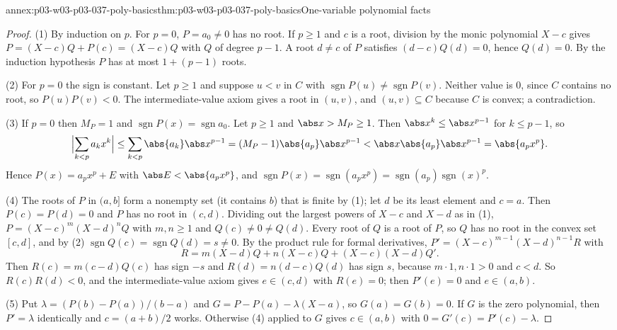 \begin{annexitem}{annex:p03-w03-p03-037-poly-basics}{thm:p03-w03-p03-037-poly-basics}{One-variable polynomial facts}
\begin{proof}
(1) By induction on \(p\).  For \(p=0\), \(P=a_0\neq0\) has no root.  If
\(p\geq1\) and \(c\) is a root, division by the monic polynomial \(X-c\)
gives \(P=(X-c)Q+P(c)=(X-c)Q\) with \(Q\) of degree \(p-1\).  A root
\(d\neq c\) of \(P\) satisfies \((d-c)Q(d)=0\), hence \(Q(d)=0\).  By the
induction hypothesis \(P\) has at most \(1+(p-1)\) roots.

(2) For \(p=0\) the sign is constant.  Let \(p\geq1\) and suppose
\(u<v\) in \(C\) with \(\operatorname{sgn}P(u)\neq\operatorname{sgn}P(v)\).
Neither value is \(0\), since \(C\) contains no root, so
\(P(u)P(v)<0\).  The intermediate-value axiom gives a root in \((u,v)\), and
\((u,v)\subseteq C\) because \(C\) is convex; a contradiction.

(3) If \(p=0\) then \(M_P=1\) and \(\operatorname{sgn}P(x)=\operatorname{sgn}a_0\).
Let \(p\geq1\) and \(\abs x>M_P\geq1\).  Then \(\abs x^k\leq\abs x^{p-1}\)
for \(k\leq p-1\), so
\[
\Bigl\lvert\sum_{k<p}a_kx^k\Bigr\rvert\leq\sum_{k<p}\abs{a_k}\abs x^{p-1}
=(M_P-1)\abs{a_p}\abs x^{p-1}<\abs x\abs{a_p}\abs x^{p-1}=\abs{a_px^p}.
\]
Hence \(P(x)=a_px^p+E\) with \(\abs E<\abs{a_px^p}\), and
\(\operatorname{sgn}P(x)=\operatorname{sgn}(a_px^p)=
\operatorname{sgn}(a_p)\operatorname{sgn}(x)^p\).

(4) The roots of \(P\) in \((a,b]\) form a nonempty set (it contains \(b\))
that is finite by (1); let \(d\) be its least element and \(c=a\).  Then
\(P(c)=P(d)=0\) and \(P\) has no root in \((c,d)\).  Dividing out the
largest powers of \(X-c\) and \(X-d\) as in (1),
\(P=(X-c)^m(X-d)^nQ\) with \(m,n\geq1\) and \(Q(c)\neq0\neq Q(d)\).  Every
root of \(Q\) is a root of \(P\), so \(Q\) has no root in the convex set
\([c,d]\), and by (2) \(\operatorname{sgn}Q(c)=\operatorname{sgn}Q(d)=s\neq0\).
By the product rule for formal derivatives,
\(P'=(X-c)^{m-1}(X-d)^{n-1}R\) with
\[
R=m(X-d)Q+n(X-c)Q+(X-c)(X-d)Q'.
\]
Then \(R(c)=m(c-d)Q(c)\) has sign \(-s\) and \(R(d)=n(d-c)Q(d)\) has sign
\(s\), because \(m\cdot1,n\cdot1>0\) and \(c<d\).  So \(R(c)R(d)<0\), and the
intermediate-value axiom gives \(e\in(c,d)\) with \(R(e)=0\); then
\(P'(e)=0\) and \(e\in(a,b)\).

(5) Put \(\lambda=(P(b)-P(a))/(b-a)\) and
\(G=P-P(a)-\lambda(X-a)\), so \(G(a)=G(b)=0\).  If \(G\) is the zero
polynomial, then \(P'=\lambda\) identically and \(c=(a+b)/2\) works.
Otherwise (4) applied to \(G\) gives \(c\in(a,b)\) with
\(0=G'(c)=P'(c)-\lambda\).


\end{proof}
\end{annexitem}
